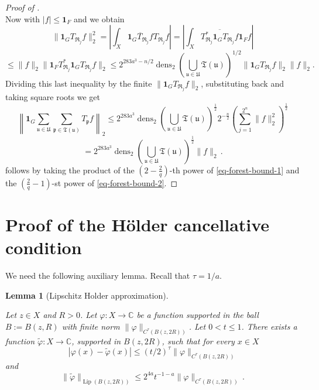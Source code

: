 \documentclass[10pt,a4paper]{article}
\theoremstyle{plain}
\newtheorem{lemma}[theorem]{Lemma}
\theoremstyle{definition}
\numberwithin{equation}{subsection}
\DeclareMathOperator{\dens}{\operatorname{dens}}
\DeclareMathOperator{\Lip}{\operatorname{Lip}}
\newcommand{\fp}{{\mathfrak p}}
\newcommand{\fu}{{\mathfrak u}}
\newcommand{\fU}{{\mathfrak U}}
\newcommand{\fT}{{\mathfrak T}}
\newcommand{\lean}[1]{}
\newcommand{\leanok}{}
\begin{document}
\begin{proof}[Proof of ]
$$    $$
    Now with $|f| \le \mathbf{1}_F$ and  we obtain
    $$
        \| \mathbf{1}_G T_{\mathfrak{R}_j} f \|_2^2 = \left| \int_X \overline{\mathbf{1}_G T_{\mathfrak{R}_j} f} T_{\mathfrak{R}_j} f \right| = \left| \int_X \overline{T_{\mathfrak{R}_j}^* \mathbf{1}_G T_{\mathfrak{R}_j} f} \mathbf{1}_F f \right|
    $$
    $$
        \le \|f\|_2 \| \mathbf{1}_F T_{\mathfrak{R}_j}^* \mathbf{1}_G T_{\mathfrak{R}_j} f \|_2 \le 2^{283a^3-n/2} \dens_2(\bigcup_{\fu\in \fU}\fT(\fu))^{1/2} \| \mathbf{1}_G T_{\mathfrak{R}_j} f \|_2 \|f\|_2.
    $$
    Dividing this last inequality by the finite $\| \mathbf{1}_G T_{\mathfrak{R}_j} f \|_2$, substituting back and taking square roots we get
    $$
        \left\|\mathbf{1}_G \sum_{\fu \in \fU} \sum_{\fp \in \fT(\fu)} T_{\fp} f\right\|_2 \le 2^{283a^3} \dens_2(\bigcup_{\fu\in \fU}\fT(\fu))^{\frac{1}{2}} 2^{-\frac{n}{2}} (\sum_{j = 1}^{2^n} \|f\|_2^2)^{\frac{1}{2}}
    $$
    \begin{equation}
        \label{eq-forest-bound-2}
        = 2^{283a^3} \dens_2(\bigcup_{\fu\in \fU}\fT(\fu))^{\frac{1}{2}} \|f\|_2\,.
    \end{equation}
     follows by taking the product of the $(2 - \frac{2}{q})$-th power of \eqref{eq-forest-bound-1} and the $(\frac{2}{q} - 1)$-st power of \eqref{eq-forest-bound-2}.
\end{proof}

\section{Proof of the H\"older cancellative condition}
\label{liphoel}

We need the following auxiliary lemma.
Recall that $\tau = 1/a$.

\begin{lemma}[Lipschitz Holder approximation]
    \label{Lipschitz-Holder-approximation}
    \leanok
    \lean{support_holderApprox_subset, enorm_holderApprox_sub_le, iLipENorm_holderApprox_le}
    Let $z\in X$ and $R>0$. Let $\varphi: X \to \mathbb{C}$ be a function supported in the ball
    $B:=B(z,R)$ with finite norm $\|\varphi\|_{C^\tau(B(z, 2R))}$.
    Let $0<t \leq 1$. There exists a function $\tilde \varphi : X \to \mathbb{C}$, supported in $B(z,2R)$, such that for every $x\in X$
    \begin{equation}\label{eq-firstt}
        |\varphi(x) - \tilde \varphi(x)| \leq (t/2)^{\tau} \|\varphi\|_{C^\tau(B(z,2R))}
    \end{equation}and
   \begin{equation}\label{eq-secondt}
       \|\tilde \varphi\|_{\Lip(B(z,2R))} \leq 2^{4a}t^{-1-a} \|\varphi\|_{C^{\tau}(B(z,2R))}\, .
   \end{equation}
\end{lemma}
\end{document}
